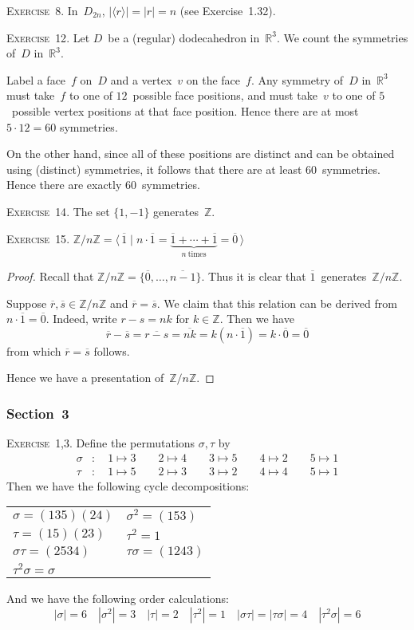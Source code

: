 \documentclass[letterpaper]{article}
\newcommand{\exercise}[1]{\goodbreak\noindent\textsc{Exercise~{#1}.}}
\newcommand{\Z}{\mathbb{Z}}
\newcommand{\R}{\mathbb{R}}
\newcommand{\res}[1]{\overline{#1}}
\newcommand{\ord}[1]{|{#1}|}
\newcommand{\cyc}[1]{\langle{#1}\rangle}
\newcommand{\pres}[1]{\langle{#1}\rangle}
\begin{document}
\exercise{8}
In~$D_{2n}$, $\ord{\cyc{r}}=\ord{r}=n$ (see Exercise~1.32).

\bigskip
\exercise{12}
Let $D$~be a (regular) dodecahedron in~$\R^3$. We count the symmetries of~$D$ in~$\R^3$.

Label a face~$f$ on~$D$ and a vertex~$v$ on the face~$f$. Any symmetry of~$D$ in~$\R^3$ must take~$f$ to one of $12$~possible face positions, and must take~$v$ to one of $5$~possible vertex positions at that face position. Hence there are at most $5\cdot 12=60$ symmetries.

On the other hand, since all of these positions are distinct and can be obtained using (distinct) symmetries, it follows that there are at least $60$~symmetries. Hence there are exactly $60$~symmetries.

\bigskip
\exercise{14}
The set $\{1,-1\}$ generates~$\Z$.

\bigskip
\exercise{15}
$\Z/n\Z=\pres{\,\res{1}\mid n\cdot\res{1}=\underbrace{\res{1}+\cdots+\res{1}}_{n~\text{times}}=\res{0}\,}$
\begin{proof}
Recall that $\Z/n\Z=\{\res{0},\ldots,\res{n-1}\}$. Thus it is clear that $\res{1}$~generates~$\Z/n\Z$. 

Suppose $\res{r},\res{s}\in\Z/n\Z$ and $\res{r}=\res{s}$. We claim that this relation can be derived from $n\cdot\res{1}=\res{0}$. Indeed, write $r-s=nk$ for $k\in\Z$. Then we have
$$\res{r}-\res{s}=\res{r-s}=\res{nk}=k(n\cdot\res{1})=k\cdot\res{0}=\res{0}$$
from which $\res{r}=\res{s}$ follows.

Hence we have a presentation of~$\Z/n\Z$.
\end{proof}

\subsubsection*{Section~3}
\exercise{1,3}
Define the permutations $\sigma,\tau$ by
\begin{align*}
\sigma&:\quad 1\mapsto 3\qquad 2\mapsto 4\qquad 3\mapsto 5\qquad 4\mapsto 2\qquad 5\mapsto 1\\
\tau&:\quad 1\mapsto 5\qquad 2\mapsto 3\qquad 3\mapsto 2\qquad 4\mapsto 4\qquad 5\mapsto 1
\end{align*}
Then we have the following cycle decompositions:
\begin{center}
\begin{tabular}{ll}
$\sigma=(135)(24)$&$\sigma^2=(153)$\\
$\tau=(15)(23)$&$\tau^2=1$\\
$\sigma\tau=(2534)$&$\tau\sigma=(1243)$\\
$\tau^2\sigma=\sigma$&
\end{tabular}
\end{center}
And we have the following order calculations:
$$\ord{\sigma}=6\quad\ord{\sigma^2}=3\quad\ord{\tau}=2\quad\ord{\tau^2}=1\quad\ord{\sigma\tau}=\ord{\tau\sigma}=4\quad\ord{\tau^2\sigma}=6$$
\end{document}
